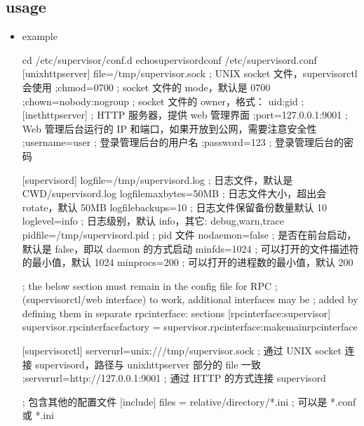\documentclass[a4paper,10pt,english]{sphinxmanual}
\begin{document}
\subsection{usage}
\label{\detokenize{linux/supervisor:usage}}\begin{itemize}
\item {} 
example

\begin{sphinxVerbatim}[commandchars=\\\{\}]
cd /etc/supervisor/conf.d
echo\PYGZus{}supervisord\PYGZus{}conf \PYGZgt{} /etc/supervisord.conf
[unix\PYGZus{}http\PYGZus{}server]
file=/tmp/supervisor.sock   ; UNIX socket 文件，supervisorctl 会使用
;chmod=0700                 ; socket 文件的 mode，默认是 0700
;chown=nobody:nogroup       ; socket 文件的 owner，格式： uid:gid
;[inet\PYGZus{}http\PYGZus{}server]         ; HTTP 服务器，提供 web 管理界面
;port=127.0.0.1:9001        ; Web 管理后台运行的 IP 和端口，如果开放到公网，需要注意安全性
;username=user              ; 登录管理后台的用户名
;password=123               ; 登录管理后台的密码

[supervisord]
logfile=/tmp/supervisord.log ; 日志文件，默认是 \PYGZdl{}CWD/supervisord.log
logfile\PYGZus{}maxbytes=50MB        ; 日志文件大小，超出会 rotate，默认 50MB
logfile\PYGZus{}backups=10           ; 日志文件保留备份数量默认 10
loglevel=info                ; 日志级别，默认 info，其它: debug,warn,trace
pidfile=/tmp/supervisord.pid ; pid 文件
nodaemon=false               ; 是否在前台启动，默认是 false，即以 daemon 的方式启动
minfds=1024                  ; 可以打开的文件描述符的最小值，默认 1024
minprocs=200                 ; 可以打开的进程数的最小值，默认 200

; the below section must remain in the config file for RPC
; (supervisorctl/web interface) to work, additional interfaces may be
; added by defining them in separate rpcinterface: sections
[rpcinterface:supervisor]
supervisor.rpcinterface\PYGZus{}factory = supervisor.rpcinterface:make\PYGZus{}main\PYGZus{}rpcinterface

[supervisorctl]
serverurl=unix:///tmp/supervisor.sock ; 通过 UNIX socket 连接 supervisord，路径与 unix\PYGZus{}http\PYGZus{}server 部分的 file 一致
;serverurl=http://127.0.0.1:9001 ; 通过 HTTP 的方式连接 supervisord

; 包含其他的配置文件
[include]
files = relative/directory/*.ini    ; 可以是 *.conf 或 *.ini


\end{sphinxVerbatim}
\end{itemize}
\end{document}
